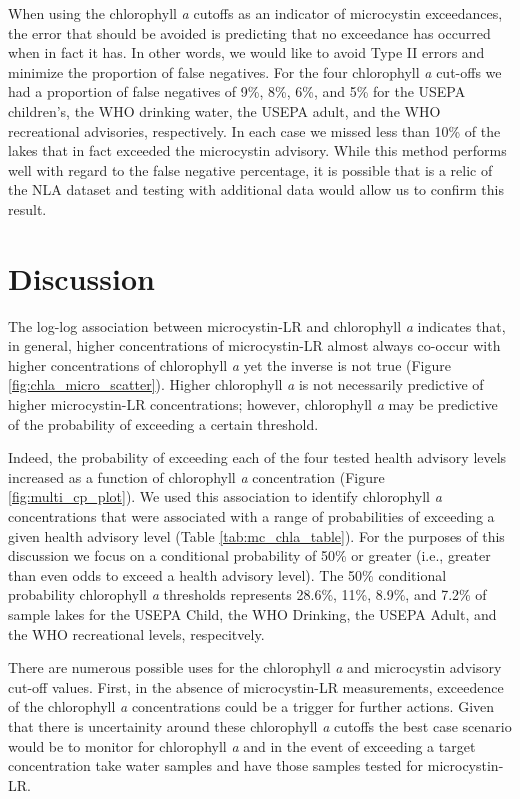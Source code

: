 \documentclass[11pt,]{article}
\begin{document}
When using the chlorophyll \emph{a} cutoffs as an indicator of
microcystin exceedances, the error that should be avoided is predicting
that no exceedance has occurred when in fact it has. In other words, we
would like to avoid Type II errors and minimize the proportion of false
negatives. For the four chlorophyll \emph{a} cut-offs we had a
proportion of false negatives of 9\%, 8\%, 6\%, and 5\% for the USEPA
children's, the WHO drinking water, the USEPA adult, and the WHO
recreational advisories, respectively. In each case we missed less than
10\% of the lakes that in fact exceeded the microcystin advisory. While
this method performs well with regard to the false negative percentage,
it is possible that is a relic of the NLA dataset and testing with
additional data would allow us to confirm this result.

\section{Discussion}\label{discussion}

The log-log association between microcystin-LR and chlorophyll \emph{a}
indicates that, in general, higher concentrations of microcystin-LR
almost always co-occur with higher concentrations of chlorophyll
\emph{a} yet the inverse is not true (Figure
\ref{fig:chla_micro_scatter}). Higher chlorophyll \emph{a} is not
necessarily predictive of higher microcystin-LR concentrations; however,
chlorophyll \emph{a} may be predictive of the probability of exceeding a
certain threshold.

Indeed, the probability of exceeding each of the four tested health
advisory levels increased as a function of chlorophyll \emph{a}
concentration (Figure \ref{fig:multi_cp_plot}). We used this association
to identify chlorophyll \emph{a} concentrations that were associated
with a range of probabilities of exceeding a given health advisory level
(Table \ref{tab:mc_chla_table}). For the purposes of this discussion we
focus on a conditional probability of 50\% or greater (i.e., greater
than even odds to exceed a health advisory level). The 50\% conditional
probability chlorophyll \emph{a} thresholds represents 28.6\%, 11\%,
8.9\%, and 7.2\% of sample lakes for the USEPA Child, the WHO Drinking,
the USEPA Adult, and the WHO recreational levels, respecitvely.

There are numerous possible uses for the chlorophyll \emph{a} and
microcystin advisory cut-off values. First, in the absence of
microcystin-LR measurements, exceedence of the chlorophyll \emph{a}
concentrations could be a trigger for further actions. Given that there
is uncertainity around these chlorophyll \emph{a} cutoffs the best case
scenario would be to monitor for chlorophyll \emph{a} and in the event
of exceeding a target concentration take water samples and have those
samples tested for microcystin-LR.
\end{document}
